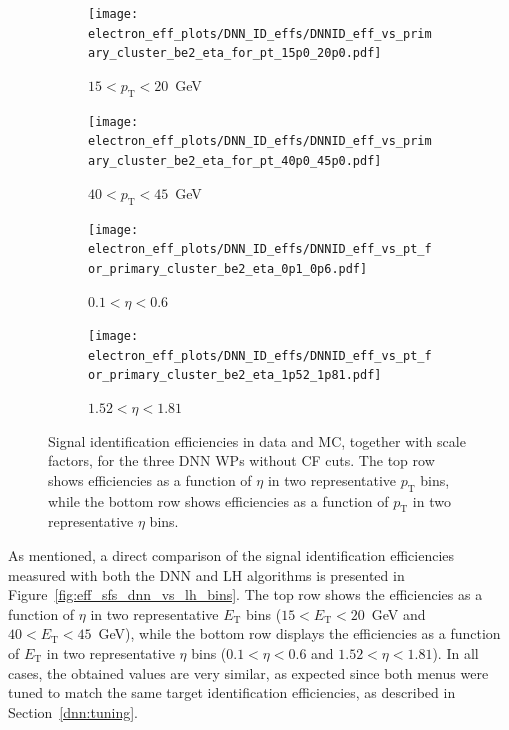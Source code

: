 \begin{figure}[htbp]
  \centering

  \begin{subfigure}[b]{0.48\textwidth}
    \centering
    \texttt{[image: electron\_eff\_plots/DNN\_ID\_effs/DNNID\_eff\_vs\_primary\_cluster\_be2\_eta\_for\_pt\_15p0\_20p0.pdf]}
    \caption{$15 < p_{\text{T}} < 20$~GeV}
    \label{fig:eff_sfs_dnn_ptbin1}
  \end{subfigure}
  \hfill
  \begin{subfigure}[b]{0.48\textwidth}
    \centering
    \texttt{[image: electron\_eff\_plots/DNN\_ID\_effs/DNNID\_eff\_vs\_primary\_cluster\_be2\_eta\_for\_pt\_40p0\_45p0.pdf]}
    \caption{$40 < p_{\text{T}} < 45$~GeV}
    \label{fig:eff_sfs_dnn_ptbin2}
  \end{subfigure}

  \vspace{0.5cm}

  \begin{subfigure}[b]{0.48\textwidth}
    \centering
    \texttt{[image: electron\_eff\_plots/DNN\_ID\_effs/DNNID\_eff\_vs\_pt\_for\_primary\_cluster\_be2\_eta\_0p1\_0p6.pdf]}
    \caption{$0.1 < \eta < 0.6$}
    \label{fig:eff_sfs_dnn_etabin1}
  \end{subfigure}
  \hfill
  \begin{subfigure}[b]{0.48\textwidth}
    \centering
    \texttt{[image: electron\_eff\_plots/DNN\_ID\_effs/DNNID\_eff\_vs\_pt\_for\_primary\_cluster\_be2\_eta\_1p52\_1p81.pdf]}
    \caption{$1.52 < \eta < 1.81$}
    \label{fig:eff_sfs_dnn_etabin2}
  \end{subfigure}

  \caption{
    Signal identification efficiencies in data and MC, together with scale factors, 
    for the three DNN WPs without CF cuts. 
    The top row shows efficiencies as a function of $\eta$ in two representative $p_{\text{T}}$ bins, 
    while the bottom row shows efficiencies as a function of $p_{\text{T}}$ in two representative $\eta$ bins.}
  \label{fig:eff_sfs_dnn_4bins}
\end{figure}

As mentioned, a direct comparison of the signal identification efficiencies measured with both the DNN and LH algorithms is presented in Figure~\ref{fig:eff_sfs_dnn_vs_lh_bins}. 
The top row shows the efficiencies as a function of $\eta$ in two representative $E_{\mathrm{T}}$ bins ($15 < E_{\mathrm{T}} < 20$~GeV and $40 < E_{\mathrm{T}} < 45$~GeV), 
while the bottom row displays the efficiencies as a function of $E_{\mathrm{T}}$ in two representative $\eta$ bins ($0.1 < \eta < 0.6$ and $1.52 < \eta < 1.81$). 
In all cases, the obtained values are very similar, as expected since both menus were tuned to match the same target identification efficiencies, as described in Section~\ref{dnn:tuning}.

